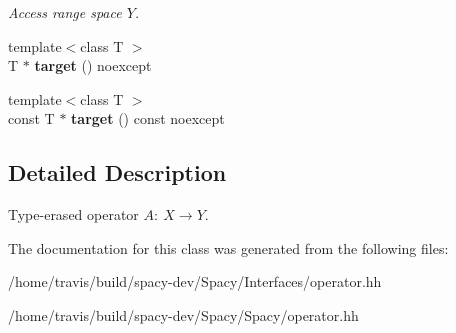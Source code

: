 \begin{DoxyCompactItemize}
\begin{DoxyCompactList}\small\item\em \-Access range space $Y$. \end{DoxyCompactList}\item 
\hypertarget{classSpacy_1_1Operator_afabc47b5debc681bb985865adc0e9fa1}{{\footnotesize template$<$class T $>$ }\\\-T $\ast$ {\bfseries target} () noexcept}\label{classSpacy_1_1Operator_afabc47b5debc681bb985865adc0e9fa1}

\item 
\hypertarget{classSpacy_1_1Operator_af4f5fc9968599011c56a59665fe42e0a}{{\footnotesize template$<$class T $>$ }\\const \-T $\ast$ {\bfseries target} () const noexcept}\label{classSpacy_1_1Operator_af4f5fc9968599011c56a59665fe42e0a}

\end{DoxyCompactItemize}


\subsection{\-Detailed \-Description}
\-Type-\/erased operator $A:\ X \to Y $. 

\-The documentation for this class was generated from the following files\-:\begin{DoxyCompactItemize}
\item 
/home/travis/build/spacy-\/dev/\-Spacy/\-Interfaces/operator.\-hh\item 
/home/travis/build/spacy-\/dev/\-Spacy/\-Spacy/operator.\-hh\end{DoxyCompactItemize}
